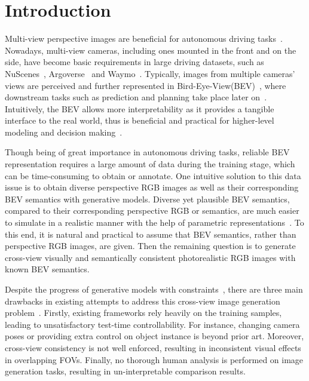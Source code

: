 \section{Introduction}
\label{sec:intro}
Multi-view perspective images are beneficial for autonomous driving tasks~\cite{caesar2020nuscenes}. Nowadays, multi-view cameras, including ones mounted in the front and on the side, have become basic requirements in large driving datasets, such as NuScenes~\cite{caesar2020nuscenes}, Argoverse~\cite{chang2019argoverse} and Waymo~\cite{sun2020scalability}. Typically, images from multiple cameras’ views are perceived and further represented in Bird-Eye-View(BEV)~\cite{Wang_2019_CVPR}, where downstream tasks such as prediction and planning take place later on~\cite{Narayanan_2021_CVPR,Dauner2023CORL}. Intuitively, the BEV allows more interpretability as it provides a tangible interface to the real world, thus is beneficial and practical for higher-level modeling and decision making~\cite{Liu_2020_CVPR,Liu_2022_CVPR}. 

Though being of great importance in autonomous driving tasks, reliable BEV representation requires a large amount of data during the training stage, which can be time-consuming to obtain or annotate. One intuitive solution to this data issue is to obtain diverse perspective RGB images as well as their corresponding BEV semantics with generative models. 
Diverse yet plausible BEV semantics, compared to their corresponding perspective RGB or semantics, are much easier to simulate in a realistic manner with the help of parametric representations~\cite{Wang_2019_CVPR}. To this end, it is natural and practical to assume that BEV semantics, rather than perspective RGB images, are given.
Then the remaining question is to generate cross-view visually and semantically consistent photorealistic RGB images with known BEV semantics.

Despite the progress of generative models with constraints~\cite{zhang2023adding}, there are three main drawbacks in existing attempts to address this cross-view image generation problem~\cite{Tang2023mvdiffusion,gao2023magicdrive,swerdlow2023street}. Firstly, existing frameworks rely heavily on the training samples, leading to unsatisfactory test-time controllability. For instance, changing camera poses or providing extra control on object instance is beyond prior art. Moreover, cross-view consistency is not well enforced, resulting in inconsistent visual effects in overlapping FOVs. Finally, no thorough human analysis is performed on image generation tasks, resulting in un-interpretable comparison results.

